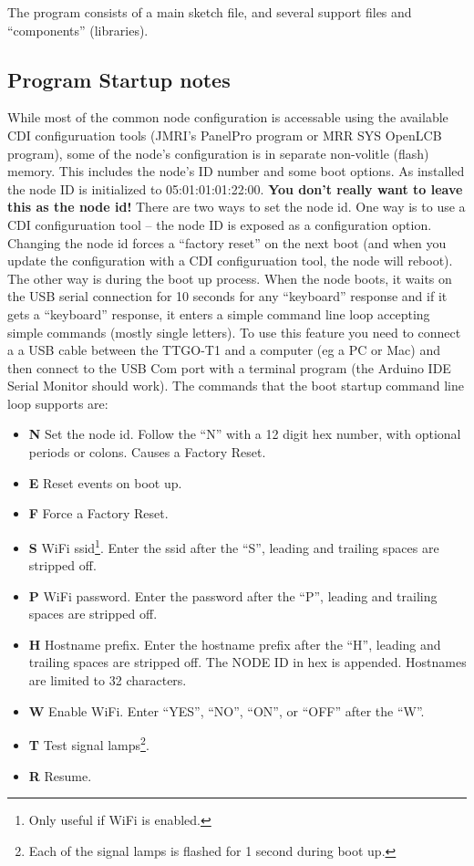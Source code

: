 \documentclass[12pt,twoside]{article}
\begin{document}
The program consists of a main sketch file, and several support files and
``components'' (libraries).

\subsection{Program Startup notes}

While most of the common node configuration is accessable using the available
CDI configuruation tools (JMRI's PanelPro program or MRR SYS OpenLCB program), 
some of the node's configuration is in separate non-volitle (flash) memory.  
This includes the node's ID number and some boot options.  As installed the 
node ID is initialized to 05:01:01:01:22:00.  \textbf{You don't really want to 
leave this as the node id!}  There are two ways to set the node id.  One way 
is to use a CDI configuruation tool -- the node ID is exposed as a 
configuration option.  Changing the node id forces a ``factory reset'' on the 
next boot (and when you update the configuration with a CDI configuruation 
tool, the node will reboot).  The other way is during the boot up process.  
When the node boots, it waits on the USB serial connection for 10 seconds for 
any ``keyboard'' response and if it gets a ``keyboard'' response, it enters a 
simple command line loop accepting simple commands (mostly single letters). 
To use this feature you need to connect a a USB cable between the TTGO-T1 and 
a computer (eg a PC or Mac) and then connect to the USB Com port with a 
terminal program (the Arduino IDE Serial Monitor should work).  The commands 
that the boot startup command line loop supports are:

\begin{itemize}
\item \textbf{N} Set the node id.  Follow the ``N'' with a 12 digit hex 
number, with optional periods or colons.  Causes a Factory Reset.
\item \textbf{E} Reset events on boot up.
\item \textbf{F} Force a Factory Reset.
\item \textbf{S} WiFi ssid\footnote{Only useful if WiFi is 
enabled.\label{fn:wifi}}. Enter the ssid after the ``S'', leading and trailing 
spaces are stripped off.
\item \textbf{P} WiFi password. Enter the password after the 
``P'', leading and trailing spaces are stripped off.
\item \textbf{H} Hostname prefix. Enter the hostname prefix 
after the ``H'', leading and trailing spaces are stripped off. The NODE ID in 
hex is appended.  Hostnames are limited to 32 characters.
\item \textbf{W} Enable WiFi. Enter ``YES'', ``NO'', 
``ON'', or ``OFF'' after the ``W''.
\item \textbf{T} Test signal lamps\footnote{Each of the signal lamps is 
flashed for 1 second during boot up.}.
\item \textbf{R} Resume.
\end{itemize}
\end{document}
